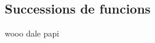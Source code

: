 \documentclass[../Apunts.tex]{subfiles}
\begin{document}
	\subsection{Successions de funcions}
	\begin{definition}
		wooo dale papi
	\end{definition}
	
\end{document}
